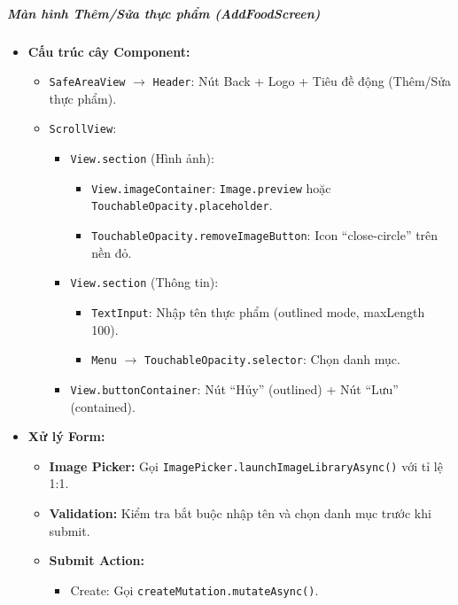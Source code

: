 \subparagraph{Màn hình Thêm/Sửa thực phẩm (AddFoodScreen)}
\begin{itemize}
    \item \textbf{Cấu trúc cây Component:}
        \begin{itemize}
            \item \texttt{SafeAreaView} $\rightarrow$ \texttt{Header}: Nút Back + Logo + Tiêu đề động (Thêm/Sửa thực phẩm).
            \item \texttt{ScrollView}:
                \begin{itemize}
                    \item \texttt{View.section} (Hình ảnh): 
                        \begin{itemize}
                            \item \texttt{View.imageContainer}: \texttt{Image.preview} hoặc \texttt{TouchableOpacity.placeholder}.
                            \item \texttt{TouchableOpacity.removeImageButton}: Icon ``close-circle'' trên nền đỏ.
                        \end{itemize}
                    \item \texttt{View.section} (Thông tin):
                        \begin{itemize}
                            \item \texttt{TextInput}: Nhập tên thực phẩm (outlined mode, maxLength 100).
                            \item \texttt{Menu} $\rightarrow$ \texttt{TouchableOpacity.selector}: Chọn danh mục.
                        \end{itemize}
                    \item \texttt{View.buttonContainer}: Nút ``Hủy'' (outlined) + Nút ``Lưu'' (contained).
                \end{itemize}
        \end{itemize}
    \item \textbf{Xử lý Form:}
        \begin{itemize}
            \item \textbf{Image Picker:} Gọi \texttt{ImagePicker.launchImageLibraryAsync()} với tỉ lệ 1:1.
            \item \textbf{Validation:} Kiểm tra bắt buộc nhập tên và chọn danh mục trước khi submit.
            \item \textbf{Submit Action:} 
                \begin{itemize}
                    \item Create: Gọi \texttt{createMutation.mutateAsync()}.

\end{itemize}
\end{itemize}
\end{itemize}
